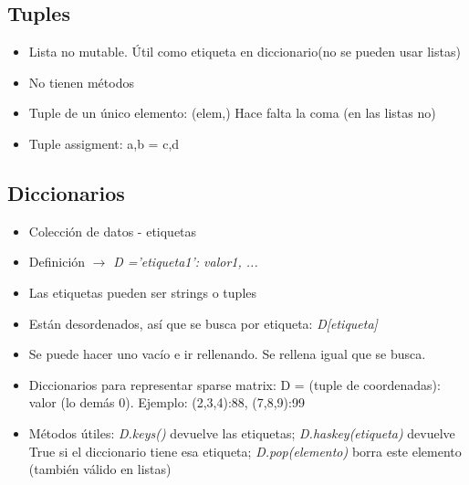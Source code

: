 	\subsection {Tuples}
	\begin{itemize}
	\item Lista no mutable. Útil como etiqueta en diccionario(no se pueden usar listas) 
	\item No tienen métodos
	\item Tuple de un único elemento: (elem,) Hace falta la coma (en las listas no)
	\item Tuple assigment: a,b = c,d
	\end{itemize}

	\subsection {Diccionarios}

	\begin{itemize}
	\item Colección de datos - etiquetas
	\item Definición $ \rightarrow $ \textit{D ={'etiqueta1': valor1, ...}}
	\item Las etiquetas pueden ser strings o tuples
	\item Están desordenados, así que se busca por etiqueta: \textit{D[etiqueta]}
	\item Se puede hacer uno vacío e ir rellenando. Se rellena igual que se busca.
	\item Diccionarios para representar sparse matrix: D = {(tuple de coordenadas): valor} (lo demás 0). Ejemplo: {(2,3,4):88, (7,8,9):99} 
	\item Métodos útiles: \textit{D.keys()} devuelve las etiquetas; \textit{D.haskey(etiqueta)} devuelve True si el diccionario tiene esa etiqueta; \textit{D.pop(elemento)} borra este elemento (también válido en listas) 
	\end{itemize}